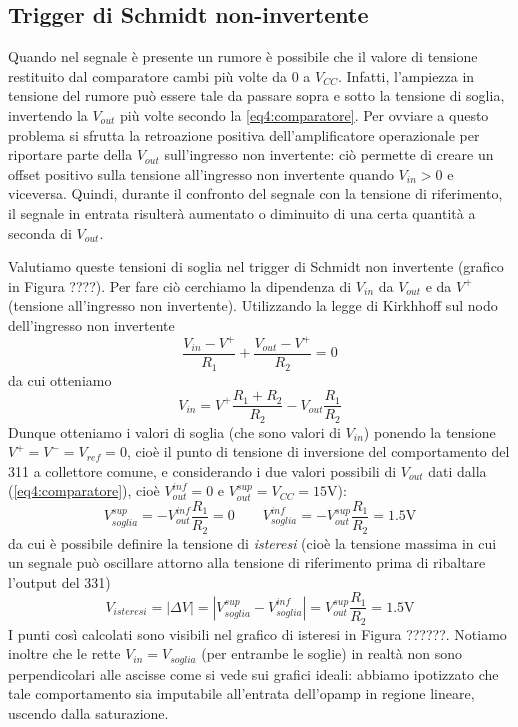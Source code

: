 \subsection{Trigger di Schmidt non-invertente}

Quando nel segnale è presente un rumore è possibile che il valore di tensione restituito dal comparatore cambi più volte da $0$ a $V_{CC}$. Infatti, l'ampiezza in tensione del rumore può essere tale da passare sopra e sotto la tensione di soglia, invertendo la $V_{out}$ più volte secondo la \ref{eq4:comparatore}. Per ovviare a questo problema si sfrutta la retroazione positiva dell'amplificatore operazionale per riportare parte della $V_{out}$ sull'ingresso non invertente: ciò permette di creare un offset positivo sulla tensione all'ingresso non invertente quando $V_{in}>0$ e viceversa. Quindi, durante il confronto del segnale con la tensione di riferimento, il segnale in entrata risulterà aumentato o diminuito di una certa quantità a seconda di $V_{out}$.

Valutiamo queste tensioni di soglia nel trigger di Schmidt non invertente (grafico in Figura ????). Per fare ciò cerchiamo la dipendenza di $V_{in}$ da $V_{out}$ e da $V^+$ (tensione all'ingresso non invertente). Utilizzando la legge di Kirkhhoff sul nodo dell'ingresso non invertente
$$\frac{V_{in}-V^+}{R_1} + \frac{V_{out}-V^+}{R_2} = 0$$
da cui otteniamo
\begin{equation}
V_{in} = V^+ \frac{R_1+R_2}{R_2} - V_{out} \frac{R_1}{R_2}
\label{eq4:v_in_parte2}
\end{equation}
Dunque otteniamo i valori di soglia (che sono valori di $V_{in}$) ponendo la tensione $V^+=V^-=V_{ref}=0$, cioè il punto di tensione di inversione del comportamento del 311 a collettore comune, e considerando i due valori possibili di $V_{out}$ dati dalla (\ref{eq4:comparatore}), cioè $V_{out}^{inf}=0$ e $V_{out}^{sup}=V_{CC}=15$\si{\volt}):
$$V_{soglia}^{sup} = - V_{out}^{inf} \frac{R_1}{R_2} = 0 \qquad V_{soglia}^{inf} = - V_{out}^{sup} \frac{R_1}{R_2} = 1.5 \si{\volt}$$
da cui è possibile definire la tensione di \textit{isteresi} (cioè la tensione massima in cui un segnale può oscillare attorno alla tensione di riferimento prima di ribaltare l'output del 331)
$$V_{isteresi} = |\Delta V| = |V_{soglia}^{sup} - V_{soglia}^{inf}| = V_{out}^{sup} \frac{R_1}{R_2} = 1.5 \si{\volt}$$
I punti così calcolati sono visibili nel grafico di isteresi in Figura ??????. Notiamo inoltre che le rette $V_{in}=V_{soglia}$ (per entrambe le soglie) in realtà non sono perpendicolari alle ascisse come si vede sui grafici ideali: abbiamo ipotizzato che tale comportamento sia imputabile all'entrata dell'opamp in regione lineare, uscendo dalla saturazione.

